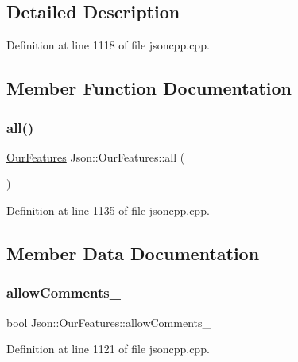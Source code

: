 \subsection{Detailed Description}


Definition at line 1118 of file jsoncpp.\+cpp.



\subsection{Member Function Documentation}
\hypertarget{class_json_1_1_our_features_a0686e1406b6677f496529f9f3fe98d1e}{}\label{class_json_1_1_our_features_a0686e1406b6677f496529f9f3fe98d1e} 
\subsubsection{\texorpdfstring{all()}{all()}}
{\footnotesize\ttfamily \hyperlink{class_json_1_1_our_features}{Our\+Features} Json\+::\+Our\+Features\+::all (\begin{DoxyParamCaption}{ }\end{DoxyParamCaption})\hspace{0.3cm}{\ttfamily [static]}}



Definition at line 1135 of file jsoncpp.\+cpp.



\subsection{Member Data Documentation}
\hypertarget{class_json_1_1_our_features_ac71bb7ba7363d3b05ed76602b036ce33}{}\label{class_json_1_1_our_features_ac71bb7ba7363d3b05ed76602b036ce33} 
\subsubsection{\texorpdfstring{allow\+Comments\+\_\+}{allowComments\_}}
{\footnotesize\ttfamily bool Json\+::\+Our\+Features\+::allow\+Comments\+\_\+}



Definition at line 1121 of file jsoncpp.\+cpp.

